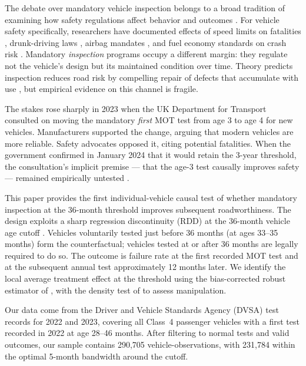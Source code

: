 \documentclass[12pt]{article}
\begin{document}
The debate over mandatory vehicle inspection belongs to a broad tradition of examining how safety regulations affect behavior and outcomes \citep{Peltzman1975,Cohen2003,Winston2006}. For vehicle safety specifically, researchers have documented effects of speed limits on fatalities \citep{Ashenfelter2012}, drunk-driving laws \citep{Levitt2002}, airbag mandates \citep{Winston2006}, and fuel economy standards on crash risk \citep{Anderson2014}. Mandatory \emph{inspection} programs occupy a different margin: they regulate not the vehicle's design but its maintained condition over time. Theory predicts inspection reduces road risk by compelling repair of defects that accumulate with use \citep{Becker1968,Viscusi2003}, but empirical evidence on this channel is fragile.

The stakes rose sharply in 2023 when the UK Department for Transport consulted on moving the mandatory \emph{first} MOT test from age 3 to age 4 for new vehicles. Manufacturers supported the change, arguing that modern vehicles are more reliable. Safety advocates opposed it, citing potential fatalities. When the government confirmed in January 2024 that it would retain the 3-year threshold, the consultation's implicit premise --- that the age-3 test causally improves safety --- remained empirically untested \citep{DfT2024}.

This paper provides the first individual-vehicle causal test of whether mandatory inspection at the 36-month threshold improves subsequent roadworthiness. The design exploits a sharp regression discontinuity (RDD) at the 36-month vehicle age cutoff \citep{Hahn2001,Imbens2008,Lee2010}. Vehicles voluntarily tested just before 36 months (at ages 33--35 months) form the counterfactual; vehicles tested at or after 36 months are legally required to do so. The outcome is failure rate at the first recorded MOT test and at the subsequent annual test approximately 12 months later. We identify the local average treatment effect at the threshold using the bias-corrected robust estimator of \citet{Calonico2014}, with the density test of \citet{McCrary2008} to assess manipulation.

Our data come from the Driver and Vehicle Standards Agency (DVSA) test records for 2022 and 2023, covering all Class~4 passenger vehicles with a first test recorded in 2022 at age 28--46 months. After filtering to normal tests and valid outcomes, our sample contains 290,705 vehicle-observations, with 231,784 within the optimal 5-month bandwidth around the cutoff.
\end{document}
